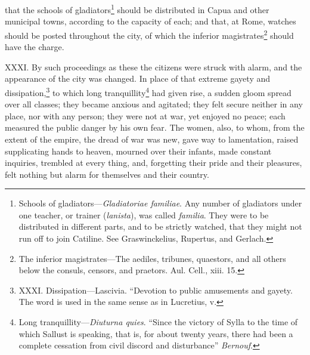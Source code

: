 that the schools of gladiators\footnote{Schools of gladiators—\emph{Gladiatoriae familiae}. Any number of
gladiators under one teacher, or trainer (\emph{lanista}), was called
\emph{familia}. They were to be distributed in different parts, and to be
strictly watched, that they might not run off to join Catiline. See
Graswinckelius, Rupertus, and Gerlach.} should be distributed in Capua and
other municipal towns, according to the capacity of each; and that, at
Rome, watches should be posted throughout the city, of which the
inferior magistrates\footnote{The inferior magistrates—The aediles, tribunes, quaestors,
and all others below the consuls, censors, and praetors. Aul. Cell.,
xiii. 15.} should have the charge.

XXXI. By such proceedings as these the citizens were struck with
alarm, and the appearance of the city was changed. In place of that
extreme gayety and dissipation,\footnote{XXXI. Dissipation—Lascivia. ``Devotion to public amusements
and gayety. The word is used in the same sense as in Lucretius, v.} to which long tranquillity\footnote{Long tranquillity—\emph{Diuturna quies}. ``Since the victory of
Sylla to the time of which Sallust is speaking, that is, for about
twenty years, there had been a complete cessation from civil discord
and disturbance'' \emph{Bernouf}.}
had given rise, a sudden gloom spread over all classes; they became
anxious and agitated; they felt secure neither in any place, nor with
any person; they were not at war, yet enjoyed no peace; each measured
the public danger by his own fear. The women, also, to whom, from the
extent of the empire, the dread of war was new, gave way to lamentation,
raised supplicating hands to heaven, mourned over their infants, made
constant inquiries, trembled at every thing, and, forgetting their pride
and their pleasures, felt nothing but alarm for themselves and their
country.

